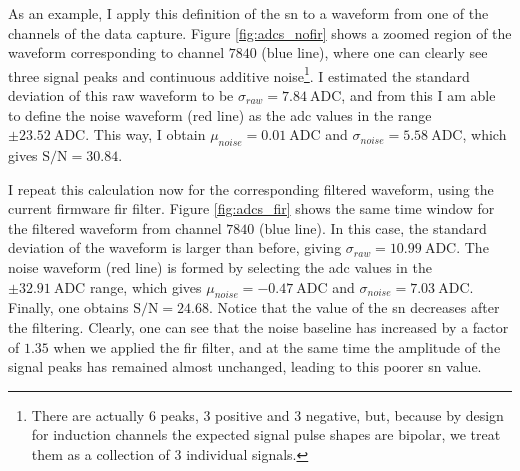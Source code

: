 As an example, I apply this definition of the \gls{sn} to a waveform from one of the channels of the data capture. Figure \ref{fig:adcs_nofir} shows a zoomed region of the waveform corresponding to channel $7840$ (blue line), where one can clearly see three signal peaks and continuous additive noise\footnote{There are actually 6 peaks, 3 positive and 3 negative, but, because by design for induction channels the expected signal pulse shapes are bipolar, we treat them as a collection of 3 individual signals.}. I estimated the standard deviation of this raw waveform to be $\sigma_{raw} = 7.84 ~ \mathrm{ADC}$, and from this I am able to define the noise waveform (red line) as the \gls{adc} values in the range $\pm 23.52 ~ \mathrm{ADC}$. This way, I obtain $\mu_{noise} = 0.01 ~ \mathrm{ADC}$ and $\sigma_{noise} = 5.58 ~ \mathrm{ADC}$, which gives $\mathrm{S/N} = 30.84$.

I repeat this calculation now for the corresponding filtered waveform, using the current firmware \gls{fir} filter. Figure \ref{fig:adcs_fir} shows the same time window for the filtered waveform from channel $7840$ (blue line). In this case, the standard deviation of the waveform is larger than before, giving $\sigma_{raw} = 10.99 ~ \mathrm{ADC}$. The noise waveform (red line) is formed by selecting the \gls{adc} values in the $\pm 32.91 ~ \mathrm{ADC}$ range, which gives $\mu_{noise} = -0.47 ~ \mathrm{ADC}$ and $\sigma_{noise} = 7.03 ~ \mathrm{ADC}$. Finally, one obtains $\mathrm{S/N} = 24.68$. Notice that the value of the \gls{sn} decreases after the filtering. Clearly, one can see that the noise baseline has increased by a factor of $1.35$ when we applied the \gls{fir} filter, and at the same time the amplitude of the signal peaks has remained almost unchanged, leading to this poorer \gls{sn} value.

